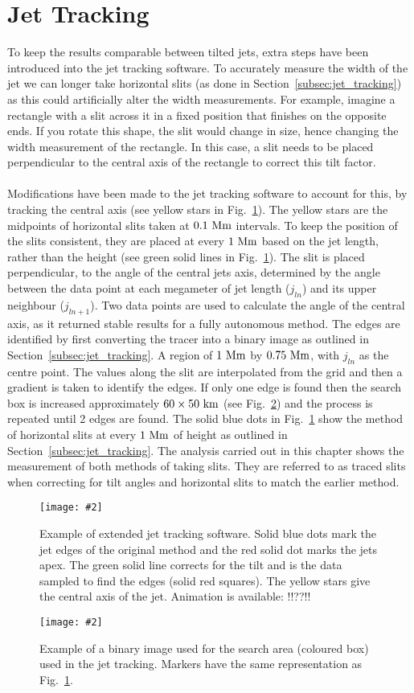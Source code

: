 \documentclass[12pt]{ociamthesis}
\newcommand{\mfig}[4]{
  \begin{figure}
  \begin{center}
  \texttt{[image: \#2]}
  \caption{#3}
  \label{#4}
  \end{center}
  \end{figure}}
\newcommand{\np}{\\ \\}
\begin{document}
\section{Jet Tracking}
\label{sec:tjt}
To keep the results comparable between tilted jets, extra steps have been introduced into the jet tracking software. To accurately measure the width of the jet we can longer take horizontal slits (as done in Section~\ref{subsec:jet_tracking}) as this could artificially alter the width measurements. For example, imagine a rectangle with a slit across it in a fixed position that finishes on the opposite ends. If you rotate this shape, the slit would change in size, hence changing the width measurement of the rectangle. In this case, a slit needs to be placed perpendicular to the central axis of the rectangle to correct this tilt factor. \np
%
Modifications have been made to the jet tracking software to account for this, by tracking the central axis (see yellow stars in Fig.~\ref{imporved_j_track_example}). The yellow stars are the midpoints of horizontal slits taken at $0.1~\rm{Mm}$ intervals. To keep the position of the slits consistent, they are placed at every $1~\rm{Mm}$ based on the jet length, rather than the height (see green solid lines in Fig.~\ref{imporved_j_track_example}). The slit is placed perpendicular, to the angle of the central jets axis, determined by the angle between the data point at each megameter of jet length ($j_{ln}$) and its upper neighbour ($j_{ln+1}$). Two data points are used to calculate the angle of the central axis, as it returned stable results for a fully autonomous method. The edges are identified by first converting the tracer into a binary image as outlined in Section~\ref{subsec:jet_tracking}. A region of $1~\rm{Mm}$ by $0.75~\rm{Mm}$, with $j_{ln}$ as the centre point. The values along the slit are interpolated from the grid and then a gradient is taken to identify the edges. If only one edge is found then the search box is increased approximately $60\times 50~\rm{km}$ (see Fig.~\ref{search_box_j_track_example}) and the process is repeated until 2 edges are found. The solid blue dots in  Fig.~\ref{imporved_j_track_example} show the method of horizontal slits at every $1~\rm{Mm}$ of height as outlined in Section~\ref{subsec:jet_tracking}. The analysis carried out in this chapter shows the measurement of both methods of taking slits. They are referred to as traced slits when correcting for tilt angles and horizontal slits to match the earlier method.
\mfig{1}{figures/jet_P300_B60A_60T_0039.png}{Example of extended jet tracking software. Solid blue dots mark the jet edges of the original method and the red solid dot marks the jets apex. The green solid line corrects for the tilt and is the data sampled to find the edges (solid red squares). The yellow stars give the central axis of the jet. Animation is available: !!??!!}{imporved_j_track_example}
\mfig{1}{figures/example_of_tilt_jet_code.png}{Example of a binary image used for the search area (coloured box) used in the jet tracking. Markers have the same representation as Fig.~\ref{imporved_j_track_example}.}{search_box_j_track_example}
\end{document}
